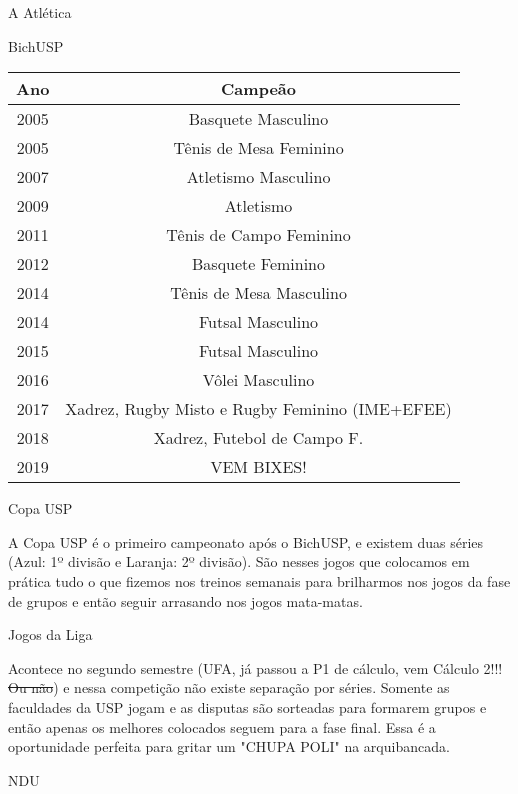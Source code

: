 \begin{secao}{A Atlética}
\begin{subsecao}{BichUSP}
\begin{center}
  \begin{tabular}{c|c}
    \hline
    Ano & Campeão\\
    \hline
    2005 & Basquete Masculino \\
    2005 & Tênis de Mesa Feminino \\
    2007 & Atletismo Masculino\\
    2009 & Atletismo\\
    2011 & Tênis de Campo Feminino\\
    2012 & Basquete Feminino\\
    2014 & Tênis de Mesa Masculino\\
    2014 & Futsal Masculino\\
    2015 & Futsal Masculino\\
    2016 & Vôlei Masculino\\
    2017 & Xadrez, Rugby Misto e Rugby Feminino (IME+EFEE)\\
    2018 & Xadrez, Futebol de Campo F.\\
    2019 & VEM BIXES!\\
    \hline
  \end{tabular}
\end{center}

\end{subsecao}
\begin{subsecao}{Copa USP}

A Copa USP é o primeiro campeonato após o BichUSP, e existem duas séries (Azul:
1º divisão e Laranja: 2º divisão). São nesses jogos que colocamos em prática
tudo o que fizemos nos treinos semanais para brilharmos nos jogos da fase de
grupos e então seguir arrasando nos jogos mata-matas.

\end{subsecao}
\begin{subsecao}{Jogos da Liga}

Acontece no segundo semestre (UFA, já passou a P1 de cálculo, vem Cálculo 2!!!
\sout{Ou não}) e nessa competição não existe separação por séries. Somente as
faculdades da USP jogam e as disputas são sorteadas para formarem grupos e
então apenas os melhores colocados seguem para a fase final. Essa é a
oportunidade perfeita para gritar um "CHUPA POLI" na arquibancada.

\end{subsecao}
\begin{subsecao}{NDU}


\end{subsecao}
\end{secao}
